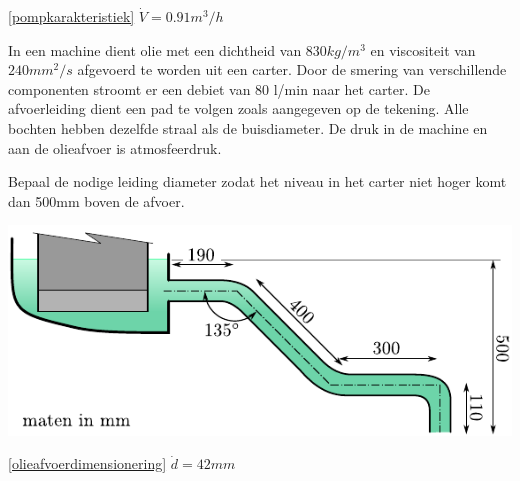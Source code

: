 \begin{antwoord}{\ref{pompkarakteristiek}}
	$\dot{V} = 0.91\unit{m^3/h}$
\end{antwoord}
\begin{toepassing}[*]
	\label{olieafvoerdimensionering}
In een machine dient olie met een dichtheid van $830\unit{kg/m^3}$ en viscositeit van $240\unit{mm^2/s}$ afgevoerd te worden uit een carter. Door de smering van verschillende componenten stroomt er een debiet van 80 l/min naar het carter. De afvoerleiding dient een pad te volgen zoals aangegeven op de tekening. Alle bochten hebben dezelfde straal als de buisdiameter. De druk in de machine en aan de olieafvoer is atmosfeerdruk.
	
Bepaal de nodige leiding diameter zodat het niveau in het carter niet hoger komt dan 500mm boven de afvoer.

	\centering
	\includegraphics{fig/stroming_in_leidingen/olieafvoerdimensionering}
\end{toepassing}
\begin{antwoord}{\ref{olieafvoerdimensionering}}
	$\dot{d} = 42\unit{mm}$
\end{antwoord}
